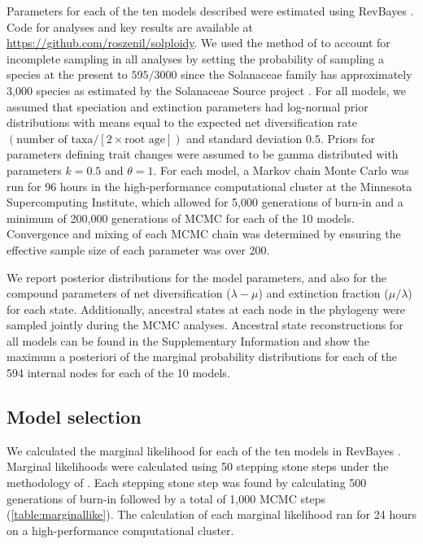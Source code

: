 Parameters for each of the ten models described were estimated using RevBayes \citep{hoehna_2016}.
Code for analyses and key results are available at \url{https://github.com/roszenil/solploidy}.
We used the method of \citet{fitzjohn_2009} to account for incomplete sampling in all analyses by setting the probability of sampling a species at the present to $595/3000$ since the Solanaceae family has approximately 3,000 species as estimated by the Solanaceae Source project \citep{solsource}.
For all models, we assumed that speciation and extinction parameters had log-normal prior distributions with means equal to the expected net diversification rate $(\text{number of taxa} / [2 \times \text{root age}])$ and standard deviation $0.5$.
Priors for parameters defining trait changes were assumed to be gamma distributed with parameters $k=0.5$ and $\theta=1$. 
For each model, a Markov chain Monte Carlo \citep[MCMC;][]{metropolis1953equation,Hastings1970} was run for 96 hours in the high-performance computational cluster at the Minnesota Supercomputing Institute, which allowed for 5,000 generations of burn-in and a minimum of 200,000 generations of MCMC for each of the 10 models. %
Convergence and mixing of each MCMC chain was determined by ensuring the effective sample size of each parameter was over 200.

We report posterior distributions for the model parameters, and also for the compound parameters of net diversification ($\lambda - \mu$) and extinction fraction ($\mu / \lambda$) for each state.
Additionally, ancestral states at each node in the phylogeny were sampled jointly during the MCMC analyses.
Ancestral state reconstructions for all models can be found in the Supplementary Information and show the maximum a posteriori of the marginal probability distributions for each of the 594 internal nodes for each of the 10 models. %

\subsection{Model selection}

We calculated the marginal likelihood for each of the ten models in RevBayes \citep{hoehna_2016}.
Marginal likelihoods were calculated using 50 stepping stone steps under the methodology of \citet{xie_2010}.
Each stepping stone step was found by calculating 500 generations of burn-in followed by a total of 1,000 MCMC steps (\cref{table:marginallike}).
The calculation of each marginal likelihood ran for 24 hours on a high-performance computational cluster.

